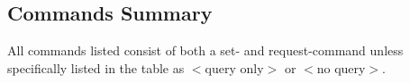 %
%
%
%

\subsection{Commands Summary}

All commands listed consist of both a set- and request-command unless specifically listed in the table as $<$query only$>$ or $<$no query$>$.

